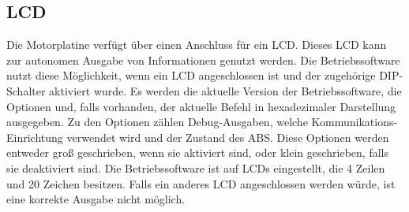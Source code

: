 \subsection{LCD}
Die Motorplatine verfügt über einen Anschluss für ein LCD. Dieses LCD kann zur autonomen Ausgabe
von Informationen genutzt werden. Die Betriebssoftware nutzt diese Möglichkeit,
wenn ein LCD angeschlossen ist und der zugehörige DIP-Schalter aktiviert wurde.
Es werden die aktuelle Version der Betriebssoftware, die Optionen und, falls vorhanden,
der aktuelle Befehl in hexadezimaler Darstellung ausgegeben. Zu den Optionen zählen Debug-Ausgaben,
welche Kommunikations-Einrichtung verwendet wird und der Zustand des ABS. Diese Optionen
werden entweder groß geschrieben, wenn sie aktiviert sind, oder klein geschrieben, falls sie
deaktiviert sind. Die Betriebssoftware ist auf LCDs eingestellt, die 4 Zeilen und 20 Zeichen besitzen.
Falls ein anderes LCD angeschlossen werden würde, ist eine korrekte Ausgabe nicht möglich.
